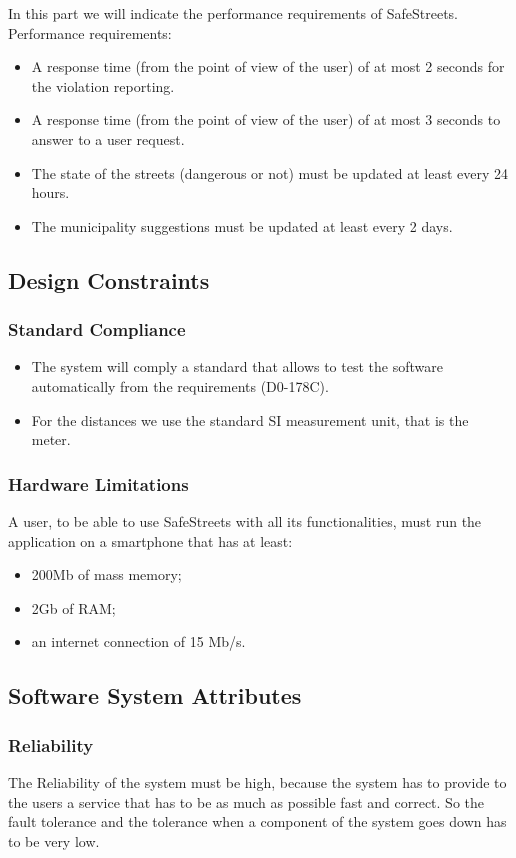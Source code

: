 \documentclass[titlepage]{article}
\begin{document}
In this part we will indicate the performance requirements of SafeStreets. Performance requirements:

\begin{itemize}
	\item A response time (from the point of view of the user) of at most 2 seconds for the violation reporting.
	\item A response time (from the point of view of the user) of at most 3 seconds to answer to a user request. 
	\item The state of the streets (dangerous or not) must be updated at least every 24 hours.
	\item The municipality suggestions must be updated at least every 2 days.
\end{itemize}

\subsection{Design Constraints}
\subsubsection{Standard Compliance}
\begin{itemize}
\item The system will comply a standard that allows to test the software automatically from the requirements (D0-178C).
\item For the distances we use the standard SI measurement unit, that is the meter.
\end{itemize}

\subsubsection{Hardware Limitations}
A user, to be able to use SafeStreets with all its functionalities, must run the application on a smartphone that has at least:
\begin{itemize}
\item 200Mb of mass memory;
\item 2Gb of RAM;
\item an internet connection of 15 Mb/s.
\end{itemize}
 
 
\subsection{Software System Attributes}
\subsubsection{Reliability}
The Reliability of the system must be high, because the system has to provide to the users a service that has to be as much as possible fast and correct. So the fault tolerance and the tolerance when a component of the system goes down has to be very low. 
\end{document}
